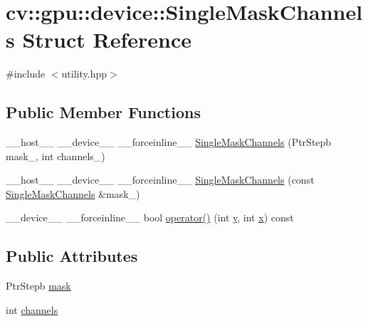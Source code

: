 \hypertarget{structcv_1_1gpu_1_1device_1_1SingleMaskChannels}{\section{cv\-:\-:gpu\-:\-:device\-:\-:Single\-Mask\-Channels Struct Reference}
\label{structcv_1_1gpu_1_1device_1_1SingleMaskChannels}
}


{\ttfamily \#include $<$utility.\-hpp$>$}

\subsection*{Public Member Functions}
\begin{DoxyCompactItemize}
\item 
\-\_\-\-\_\-host\-\_\-\-\_\- \-\_\-\-\_\-device\-\_\-\-\_\- \-\_\-\-\_\-forceinline\-\_\-\-\_\- \hyperlink{structcv_1_1gpu_1_1device_1_1SingleMaskChannels_ac4704a74b56d0d00725aae265208b544}{Single\-Mask\-Channels} (Ptr\-Stepb mask\-\_\-, int channels\-\_\-)
\item 
\-\_\-\-\_\-host\-\_\-\-\_\- \-\_\-\-\_\-device\-\_\-\-\_\- \-\_\-\-\_\-forceinline\-\_\-\-\_\- \hyperlink{structcv_1_1gpu_1_1device_1_1SingleMaskChannels_a587a052786d73003ab0a4dd1b437ddea}{Single\-Mask\-Channels} (const \hyperlink{structcv_1_1gpu_1_1device_1_1SingleMaskChannels}{Single\-Mask\-Channels} \&mask\-\_\-)
\item 
\-\_\-\-\_\-device\-\_\-\-\_\- \-\_\-\-\_\-forceinline\-\_\-\-\_\- bool \hyperlink{structcv_1_1gpu_1_1device_1_1SingleMaskChannels_a40502e772244f40e1f01701509544697}{operator()} (int \hyperlink{highgui__c_8h_af1202c02b14870c18fb3a1da73e9e7c7}{y}, int \hyperlink{highgui__c_8h_a6150e0515f7202e2fb518f7206ed97dc}{x}) const 
\end{DoxyCompactItemize}
\subsection*{Public Attributes}
\begin{DoxyCompactItemize}
\item 
Ptr\-Stepb \hyperlink{structcv_1_1gpu_1_1device_1_1SingleMaskChannels_aae5b54b8d66279c670a5b962e277a41e}{mask}
\item 
int \hyperlink{structcv_1_1gpu_1_1device_1_1SingleMaskChannels_a1910319f04f60a77dfcebed6b534157f}{channels}
\end{DoxyCompactItemize}


